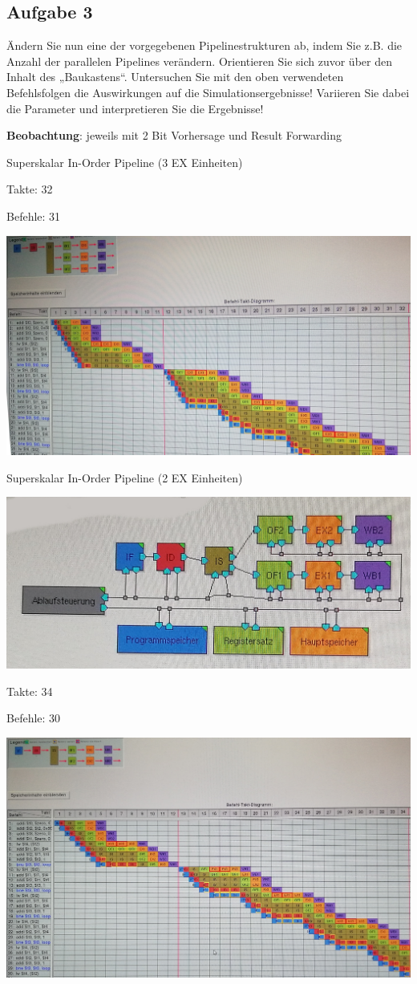 \documentclass[a4paper,12pt,titlepage]{scrartcl}
\begin{document}
\subsection*{Aufgabe 3}
Ändern Sie nun eine der vorgegebenen Pipelinestrukturen ab, indem Sie z.B. die Anzahl der parallelen Pipelines verändern. Orientieren Sie sich zuvor über den Inhalt des „Baukastens“. Untersuchen Sie mit den oben verwendeten Befehlsfolgen die Auswirkungen auf die Simulationsergebnisse! Variieren Sie dabei die Parameter und interpretieren Sie die Ergebnisse!

\textbf{Beobachtung}: jeweils mit 2 Bit Vorhersage und Result Forwarding
\begin{itemize*}
    \item Superskalar In-Order Pipeline (3 EX Einheiten)
    \begin{itemize*}
        \item Takte: 32
        \item Befehle: 31
        \item \includegraphics[width=.4\linewidth]{Assets/RA2-65225.jpg}
    \end{itemize*}
    \item Superskalar In-Order Pipeline (2 EX Einheiten)
    \begin{itemize*}
        \item \includegraphics[width=.4\linewidth]{Assets/RA2-65346.jpg}
        \item Takte: 34
        \item Befehle: 30
        \item \includegraphics[width=.4\linewidth]{Assets/RA2-65517.jpg}

\end{itemize*}
\end{itemize*}
\end{document}
